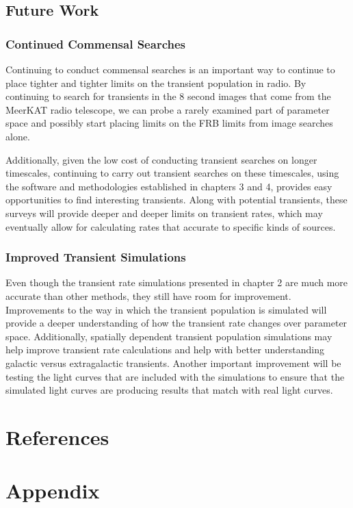 \documentclass[12pt]{article}
\begin{document}
\subsection{Future Work}
\subsubsection{Continued Commensal Searches} 
Continuing to conduct commensal searches is an important way to continue to place tighter and tighter limits on the transient population in radio. By continuing to search for transients in the 8 second images that come from the MeerKAT radio telescope, we can probe a rarely examined part of parameter space and possibly start placing limits on the FRB limits from image searches alone. 

Additionally, given the low cost of conducting transient searches on longer timescales, continuing to carry out transient searches on these timescales, using the software and methodologies established in chapters 3 and 4, provides easy opportunities to find interesting transients. Along with potential transients, these surveys will provide deeper and deeper limits on transient rates, which may eventually allow for calculating rates that accurate to specific kinds of sources.

\subsubsection{Improved Transient Simulations}
Even though the transient rate simulations presented in chapter 2 are much more accurate than other methods, they still have room for improvement. Improvements to the way in which the transient population is simulated will provide a deeper understanding of how the transient rate changes over parameter space. Additionally, spatially dependent transient population simulations may help improve transient rate calculations and help with better understanding galactic versus extragalactic transients. Another important improvement will be testing the light curves that are included with the simulations to ensure that the simulated light curves are producing results that match with real light curves. 
\newpage
\section{References}
{\def\section*#1{}
\singlespacing


}
\newpage
{}



\doublespacing
\appendix


\section{Appendix}\label{appendixlabel}
\end{document}
